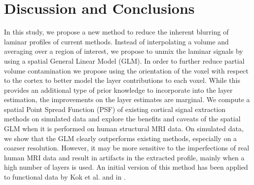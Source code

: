 \section{Discussion and Conclusions}
In this study, we propose a new method to reduce the inherent blurring of laminar profiles of current methods. Instead of interpolating a volume and averaging over a region of interest, we propose to unmix the laminar signals by using a spatial General Linear Model (GLM). In order to further reduce partial volume contamination we propose using the orientation of the voxel with respect to the cortex to better model the layer contributions to each voxel. While this provides an additional type of prior knowledge to incorporate into the layer estimation, the improvements on the layer estimates are marginal. We compute a spatial Point Spread Function (PSF) of existing cortical signal extraction methods on simulated data and explore the benefits and caveats of the spatial GLM when it is performed on human structural MRI data. On simulated data, we show that the GLM clearly outperforms existing methods, especially on a coarser resolution. However, it may be more sensitive to the imperfections of real human MRI data and result in artifacts in the extracted profile, mainly when a high number of layers is used. An initial version of this method has been applied to functional data by Kok et al. \cite{Kok2016} and in  \cite{VanMourik2018a}.

